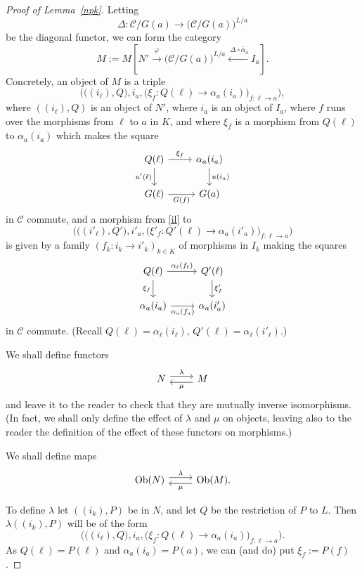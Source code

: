 \documentclass[12pt]{article}
\theoremstyle{remark}
\theoremstyle{definition}
\newcommand{\C}{\mathcal C}
\newcommand{\pp}{\varphi}
\DeclareMathOperator{\Ob}{Ob}
\begin{document}
\begin{proof}[Proof of Lemma~\ref{npk}]
Letting 
$$
\Delta:\C/G(a)\to\big(\C/G(a)\big)^{L/a}
$$ 
be the diagonal functor, we can form the category 
$$
M:=M\left[N'\xrightarrow{\pp}\big(\C/G(a)\big)^{L/a}\xleftarrow{\ \Delta\circ\widetilde{\alpha_a}}I_a\right].
$$ 
Concretely, an object of $M$ is a triple 
%
\begin{equation}\label{il}
\Big(\big((i_\ell),Q\big),i_a,\big(\xi_f:Q(\ell)\to\alpha_a(i_a)\big)_{f:\ell\to a}\Big),
\end{equation}
%  
where $((i_\ell),Q)$ is an object of $N'$, where $i_a$ is an object of $I_a$, where $f$ runs over the morphisms from $\ell$ to $a$ in $K$, and where $\xi_f$ is a morphism from $Q(\ell)$ to $\alpha_a(i_a)$ which makes the square  
$$
\begin{tikzcd}
Q(\ell)\ar{r}{\xi_f}\ar{d}[swap]{u'(\ell)}&\alpha_a(i_a)\ar{d}{u(i_a)}\\ 
G(\ell)\ar{r}[swap]{G(f)}&G(a) 
\end{tikzcd}
$$ 
in $\C$ commute, and a morphism from \eqref{il} to 
$$
\Big(\big((i'_\ell),Q'\big),i'_a,\big(\xi'_f:Q'(\ell)\to\alpha_a(i'_a)\big)_{f:\ell\to a}\Big)
$$ 
is given by a family $(f_k:i_k\to i'_k)_{k\in K}$ of morphisms in $I_k$ making the squares 
$$
\begin{tikzcd}
Q(\ell)\ar{r}{\alpha_\ell(f_\ell)}\ar{d}[swap]{\xi_f}&Q'(\ell)\ar{d}{\xi'_f}\\ 
\alpha_a(i_a)\ar{r}[swap]{\alpha_a(f_a)}&\alpha_a(i'_a) 
\end{tikzcd}
$$ 
in $\C$ commute. (Recall $Q(\ell)=\alpha_\ell(i_\ell)$, $Q'(\ell)=\alpha_\ell(i'_\ell)$.)

We shall define functors 
$$
\begin{tikzcd}
N\ar[yshift=0.7ex]{r}{\lambda}&M\ar[yshift=-0.7ex]{l}{\mu}
\end{tikzcd}
$$ 
and leave it to the reader to check that they are mutually inverse isomorphisms. (In fact, we shall only define the effect of $\lambda$ and $\mu$ on objects, leaving also to the reader the definition of the effect of these functors on morphisms.)

We shall define maps 
$$
\begin{tikzcd}
\Ob(N)\ar[yshift=0.7ex]{r}{\lambda}&\Ob(M).\ar[yshift=-0.7ex]{l}{\mu}
\end{tikzcd}
$$ 

To define $\lambda$ let $((i_k),P)$ be in $N$, and let $Q$ be the restriction of $P$ to $L$. Then $\lambda((i_k),P)$ will be of the form 
$$
\Big(\big((i_\ell),Q\big),i_a,\big(\xi_f:Q(\ell)\to\alpha_a(i_a)\big)_{f:\ell\to a}\Big).
$$ 
As $Q(\ell)=P(\ell)$ and $\alpha_a(i_a)=P(a)$, we can (and do) put $\xi_f:=P(f)$. 


\end{proof}
\end{document}
